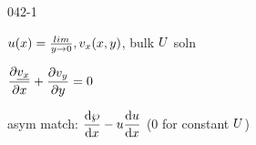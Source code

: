 \begin{mitframe}{042-1}
\begin{listone}
\begin{listtwo}
\begin{listthree}
\begin{listtwo}
            			\begin{listthree}
                        \item $\forcepot(\disp)=\frac{lim}{y\rightarrow0},\vvel_{\disp}(\disp,y)$, bulk $\uvel$ soln
                        \item $\dfrac{\partial\uline{\vvel_{\disp}}}{\partial\disp}+\dfrac{\partial\vvel_y}{\partial{y}}=0$
                        \item asym match: $\dfrac{\mathrm{d}\dynpress}{\mathrm{d}\disp}-\forcepot\dfrac{\mathrm{d}\forcepot}{\mathrm{d}\disp}$ (0 for constant $\uvel$)
                        
                        \end{listthree}            
            \end{listtwo}

                            \end{listthree}
            
            \end{listtwo}
\end{listone}
\end{mitframe}